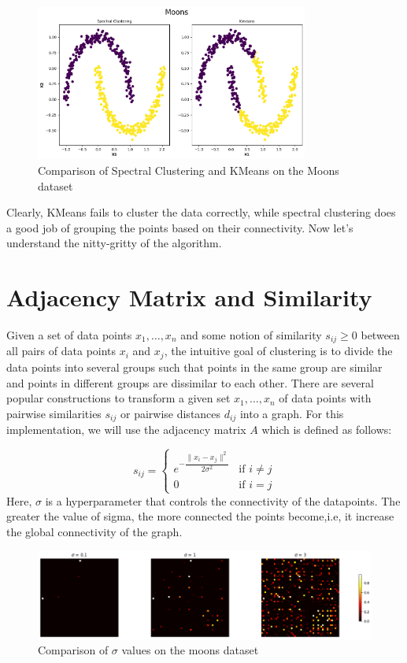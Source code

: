 \documentclass{article}
\begin{document}
\begin{figure}[ht]
  \centering
  \includegraphics[width=0.8\textwidth]{images/comp.png}
  \caption{Comparison of Spectral Clustering and KMeans on the Moons dataset}
  \label{fig:comparison}
\end{figure}
Clearly, KMeans fails to cluster the data correctly, while spectral clustering does a good job of grouping the points based on their connectivity. Now let's understand the nitty-gritty of the algorithm.

\section{Adjacency Matrix and Similarity}
\label{sec:adjacency}
Given a set of data points $x_1, \ldots, x_n$ and some notion of similarity $s_{ij} \geq 0$ between all pairs of data points $x_i$ and $x_j$, the intuitive goal of clustering is to divide the data points into several groups such that points in the same group are similar and points in different groups are dissimilar to each other. There are several popular constructions to transform a given set $x_1, \ldots,x_n$ of data points with pairwise
similarities $s_{ij}$ or pairwise distances $d_{ij}$ into a graph. For this implementation, we will use the adjacency matrix $A$ which is defined as follows:



\begin{equation}
s_{ij} =
\begin{cases}
e^{-\dfrac{\|x_i - x_j\|^2}{2\sigma^2}} & \text{if } i \ne j \\
0 & \text{if } i = j
\end{cases}
\end{equation}
Here, $\sigma$ is a hyperparameter that controls the connectivity of the datapoints. The greater the value of sigma, the more connected the points become,i.e, it increase the global connectivity of the graph.
\begin{figure}[ht]
  \centering
  \includegraphics[width=1.0\textwidth]{images/sigma_comp.png}
  \caption{Comparison of $\sigma$ values on the moons dataset}
  \label{fig:sigma_comparison}
\end{figure} 
\newline
\end{document}
